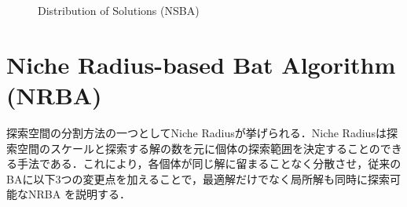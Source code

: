 \documentclass[a4j,11pt]{jarticle}
\begin{document}
\begin{figure}[t]
\centering
{}
\caption{Distribution of Solutions (NSBA)}
\label{fig:nsba-results_nsba_1000}
\end{figure}

\FloatBarrier
\newpage
\section{Niche Radius-based Bat Algorithm (NRBA)}
\label{sec:NRBA}
探索空間の分割方法の一つとしてNiche Radiusが挙げられる．Niche Radiusは探索空間のスケールと探索する解の数を元に個体の探索範囲を決定することのできる手法である．これにより，各個体が同じ解に留まることなく分散させ，従来のBAに以下3つの変更点を加えることで，最適解だけでなく局所解も同時に探索可能なNRBA \cite{NRBA} を説明する．
\end{document}
